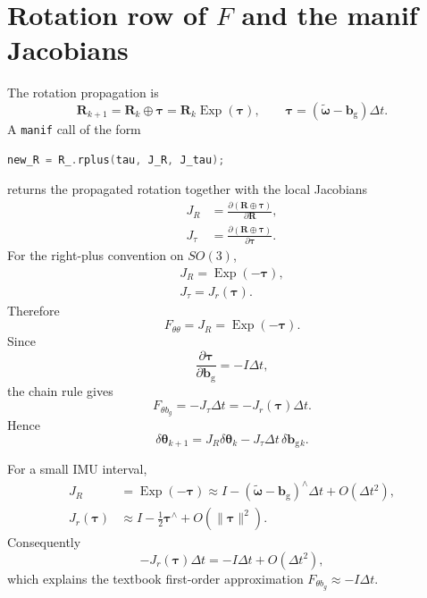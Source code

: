 \documentclass[11pt]{article}
\newcommand{\R}{\mathbf{R}}
\newcommand{\bg}{\mathbf{b}_{\mathrm{g}}}
\newcommand{\Exp}{\operatorname{Exp}}
\newcommand{\skewop}[1]{#1^{\wedge}}
\newcommand{\omegatilde}{\tilde{\bm\omega}}
\begin{document}
\section{Rotation row of $F$ and the manif Jacobians}
The rotation propagation is
\begin{equation}
\R_{k+1}=\R_k\oplus\bm\tau=\R_k\Exp(\bm\tau),
\qquad
\bm\tau=(\omegatilde-\bg)\Delta t.
\end{equation}
A \texttt{manif} call of the form
\begin{lstlisting}[language=C++,basicstyle=\ttfamily\small]
new_R = R_.rplus(tau, J_R, J_tau);
\end{lstlisting}
returns the propagated rotation together with the local Jacobians
\begin{align}
J_R &= \frac{\partial(\R\oplus\bm\tau)}{\partial\R},\\
J_\tau &= \frac{\partial(\R\oplus\bm\tau)}{\partial\bm\tau}.
\end{align}
For the right-plus convention on $SO(3)$,
\begin{align}
\boxed{J_R=\Exp(-\bm\tau)},\\
\boxed{J_\tau=J_r(\bm\tau)}.
\end{align}
Therefore
\begin{equation}
\boxed{F_{\theta\theta}=J_R=\Exp(-\bm\tau).}
\end{equation}
Since
\begin{equation}
\frac{\partial\bm\tau}{\partial\bg}=-I\Delta t,
\end{equation}
the chain rule gives
\begin{equation}
\boxed{F_{\theta b_g}=-J_\tau\Delta t=-J_r(\bm\tau)\Delta t.}
\end{equation}
Hence
\begin{equation}
\delta\bm\theta_{k+1}
=J_R\delta\bm\theta_k-J_\tau\Delta t\,\delta\bg{}_k.
\end{equation}

For a small IMU interval,
\begin{align}
J_R
&=\Exp(-\bm\tau)
\approx I-\skewop{(\omegatilde-\bg)}\Delta t+O(\Delta t^2),\\
J_r(\bm\tau)
&\approx I-\frac12\skewop{\bm\tau}+O(\|\bm\tau\|^2).
\end{align}
Consequently
\begin{equation}
-J_r(\bm\tau)\Delta t
=-I\Delta t+O(\Delta t^2),
\end{equation}
which explains the textbook first-order approximation $F_{\theta b_g}\approx-I\Delta t$.
\end{document}
